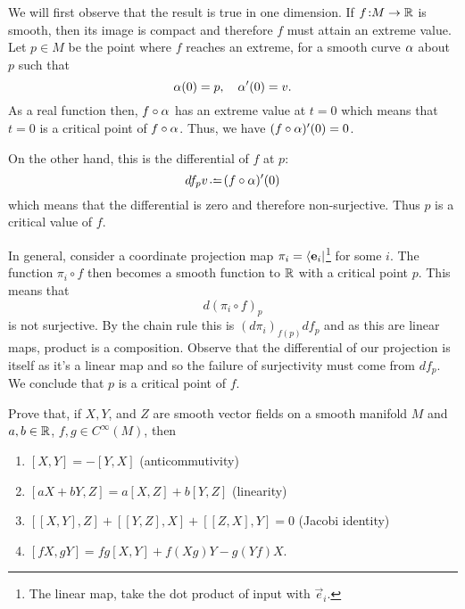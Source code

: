 \documentclass[12pt]{memoir}
\def\co{\colon}
\newcommand{\from}{\co\!\!}
\begin{document}
   \begin{ptcbr}
	We will first observe that the result is true in one dimension. If $f\from M\to\bR$ is smooth, then its image is compact and therefore $f$ must attain an extreme value. Let $p\in M$ be the point where $f$ reaches an extreme, for a smooth curve $\alpha$ about $p$ such that 
	$$\alpha(0)=p,\quad \alpha'(0)=v.$$
	As a real function then, $f\circ\alpha$ has an extreme value at $t=0$ which means that $t=0$ is a critical point of $f\circ\alpha$. Thus, we have $(f\circ\alpha)'(0)=0$.\par
	On the other hand, this is the differential of $f$ at $p$:
	$$df_pv\defeq(f\circ\al)'(0)$$
	which means that the differential is zero and therefore non-surjective. Thus $p$ is a critical value of $f$.\par
	In general, consider a coordinate projection map $\pi_i=\bra{\mathbf{e}_i}$\footnote{The linear map, take the dot product of input with $\vec e_i$.} for some $i$. The function $\pi_i\circ f$ then becomes a smooth function to $\mathbb{R}$ with a critical point $p$. This means that 
	$$d(\pi_i\circ f)_p$$
	is not surjective. By the chain rule this is $(d\pi_i)_{f(p)}df_p$ and as this are linear maps, product is a composition. Observe that the differential of our projection is itself as it's a linear map and so the failure of surjectivity must come from $df_p$. We conclude that $p$ is a critical point of $f$.
   \end{ptcbr}
   \begin{Ej}
    Prove that, if $X, Y$, and $Z$ are smooth vector fields on a smooth manifold $M$ and $a,b \in \mathbb{R}$, $f,g \in C^\infty (M)$, then
	\begin{enumerate}
		\item $[X,Y] = -[Y,X]$ (anticommutivity)
		\item $[aX+bY,Z] = a[X,Z]+b[Y,Z]$ (linearity)
		\item $[[X,Y],Z] + [[Y,Z],X] + [[Z,X],Y] = 0$ (Jacobi identity)
		\item $[fX,gY] = fg[X,Y] + f(Xg)Y - g(Yf)X$.
	\end{enumerate}
   \end{Ej}
   
\end{document}
